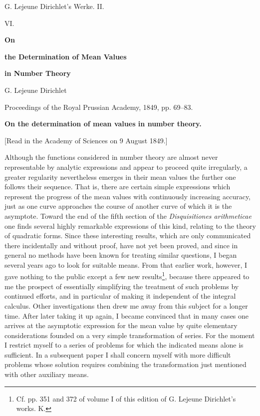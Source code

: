 \documentclass[11pt]{article}
\begin{document}
\begin{center}
{\Large G. Lejeune Dirichlet's Werke. II.}\par\vspace{1.2em}
{\Large VI.}\par\vspace{0.5em}
{\LARGE \textbf{On}}\par
{\LARGE \textbf{the Determination of Mean Values}}\par
{\LARGE \textbf{in Number Theory}}\par\vspace{1em}
{\large G. Lejeune Dirichlet}\par\vspace{0.5em}
{\small Proceedings of the Royal Prussian Academy, 1849, pp. 69--83.}
\end{center}

\begin{center}
\textbf{On the determination of mean values in number theory.}\par
{\small [Read in the Academy of Sciences on 9 August 1849\footnotemark.]}
\end{center}

Although the functions considered in number theory are almost never representable by analytic expressions and appear to proceed quite irregularly, a greater regularity nevertheless emerges in their mean values the further one follows their sequence. That is, there are certain simple expressions which represent the progress of the mean values with continuously increasing accuracy, just as one curve approaches the course of another curve of which it is the asymptote. Toward the end of the fifth section of the \emph{Disquisitiones arithmeticae} one finds several highly remarkable expressions of this kind, relating to the theory of quadratic forms. Since these interesting results, which are only communicated there incidentally and without proof, have not yet been proved, and since in general no methods have been known for treating similar questions, I began several years ago to look for suitable means. From that earlier work, however, I gave nothing to the public except a few new results\footnote{Cf. pp. 351 and 372 of volume I of this edition of G. Lejeune Dirichlet's works. K.}, because there appeared to me the prospect of essentially simplifying the treatment of such problems by continued efforts, and in particular of making it independent of the integral calculus. Other investigations then drew me away from this subject for a longer time. After later taking it up again, I became convinced that in many cases one arrives at the asymptotic expression for the mean value by quite elementary considerations founded on a very simple transformation of series. For the moment I restrict myself to a series of problems for which the indicated means alone is sufficient. In a subsequent paper I shall concern myself with more difficult problems whose solution requires combining the transformation just mentioned with other auxiliary means.
\end{document}
